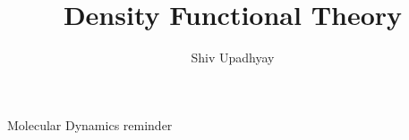 \documentclass{beamer}
\title{{\Huge Density Functional Theory}}
\author[Shiv]{Shiv Upadhyay}
\institute{\normalsize{\textit{University of Pittsburgh}
\vspace{0.3cm}}}
\begin{document}
\frame{\vspace{-1.25cm}\titlepage}
\begin{frame}{Molecular Dynamics reminder}
\end{frame}
\end{document}
